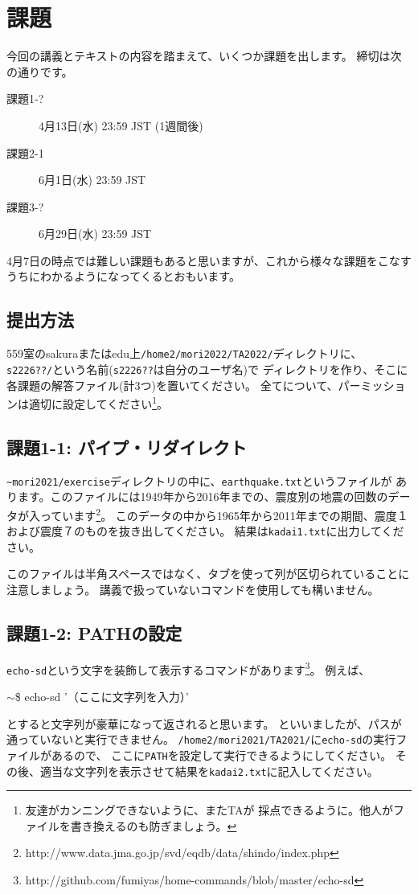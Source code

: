 \documentclass[a4j]{ltjsreport}
\begin{document}
    \chapter{課題}
    今回の講義とテキストの内容を踏まえて、いくつか課題を出します。
    締切は次の通りです。
    \begin{description}
        \item[課題1-?] 4月13日(水) 23:59 JST (1週間後)
        \item[課題2-1] 6月1日(水) 23:59 JST
        \item[課題3-?] 6月29日(水) 23:59 JST
    \end{description}
    4月7日の時点では難しい課題もあると思いますが、これから様々な課題をこなすうちにわかるようになってくるとおもいます。

    \section*{提出方法}
    559室のsakuraまたはedu上\verb+/home2/mori2022/TA2022/+ディレクトリに、
    \verb+s2226??/+という名前(\verb+s2226??+は自分のユーザ名)で
    ディレクトリを作り、そこに各課題の解答ファイル(計3つ)を置いてください。
    全てについて、パーミッションは適切に設定してください\footnote{友達がカンニングできないように、またTAが
    採点できるように。他人がファイルを書き換えるのも防ぎましょう。}。

    \section{課題1-1: パイプ・リダイレクト}
    \verb+~mori2021/exercise+ディレクトリの中に、\verb+earthquake.txt+というファイルが
    あります。このファイルには1949年から2016年までの、震度別の地震の回数のデータが入っています\footnote{http://www.data.jma.go.jp/svd/eqdb/data/shindo/index.php}。
    このデータの中から1965年から2011年までの期間、震度１および震度７のものを抜き出してください。
    結果は\verb+kadai1.txt+に出力してください。

    このファイルは半角スペースではなく、タブを使って列が区切られていることに
    注意しましょう。
    講義で扱っていないコマンドを使用しても構いません。

    \section{課題1-2: PATHの設定}
    \verb+echo-sd+という文字を装飾して表示するコマンドがあります\footnote{http://github.com/fumiyas/home-commands/blob/master/echo-sd}。
    例えば、
    \begin{screen}
        $\sim$\$ echo-sd '（ここに文字列を入力）'
    \end{screen}
    とすると文字列が豪華になって返されると思います。
    といいましたが、パスが通っていないと実行できません。
    \verb+/home2/mori2021/TA2021/+に\verb+echo-sd+の実行ファイルがあるので、
    ここに\verb+PATH+を設定して実行できるようにしてください。
    その後、適当な文字列を表示させて結果を\verb+kadai2.txt+に記入してください。
\end{document}
